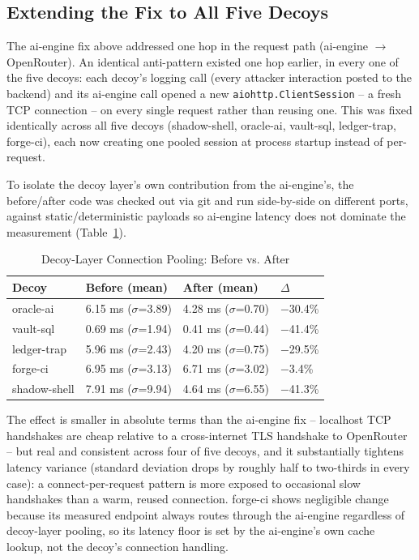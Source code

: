 \documentclass[conference]{IEEEtran}
\begin{document}
\subsection{Extending the Fix to All Five Decoys}

The ai-engine fix above addressed one hop in the request path (ai-engine
$\rightarrow$ OpenRouter). An identical anti-pattern existed one hop
earlier, in every one of the five decoys: each decoy's logging call (every
attacker interaction posted to the backend) and its ai-engine call opened a
new \texttt{aiohttp.ClientSession} -- a fresh TCP connection -- on every
single request rather than reusing one. This was fixed identically across
all five decoys (shadow-shell, oracle-ai, vault-sql, ledger-trap,
forge-ci), each now creating one pooled session at process startup instead
of per-request.

To isolate the decoy layer's own contribution from the ai-engine's, the
before/after code was checked out via git and run side-by-side on
different ports, against static/deterministic payloads so ai-engine
latency does not dominate the measurement (Table~\ref{tab:decoys}).

\begin{table}[htbp]
\caption{Decoy-Layer Connection Pooling: Before vs. After}
\label{tab:decoys}
\centering
\begin{tabular}{@{}llll@{}}
\toprule
\textbf{Decoy} & \textbf{Before (mean)} & \textbf{After (mean)} & \textbf{$\Delta$} \\
\midrule
oracle-ai & 6.15 ms ($\sigma$=3.89) & 4.28 ms ($\sigma$=0.70) & $-$30.4\% \\
vault-sql & 0.69 ms ($\sigma$=1.94) & 0.41 ms ($\sigma$=0.44) & $-$41.4\% \\
ledger-trap & 5.96 ms ($\sigma$=2.43) & 4.20 ms ($\sigma$=0.75) & $-$29.5\% \\
forge-ci & 6.95 ms ($\sigma$=3.13) & 6.71 ms ($\sigma$=3.02) & $-$3.4\% \\
shadow-shell & 7.91 ms ($\sigma$=9.94) & 4.64 ms ($\sigma$=6.55) & $-$41.3\% \\
\bottomrule
\end{tabular}
\end{table}

The effect is smaller in absolute terms than the ai-engine fix -- localhost
TCP handshakes are cheap relative to a cross-internet TLS handshake to
OpenRouter -- but real and consistent across four of five decoys, and it
substantially tightens latency variance (standard deviation drops by
roughly half to two-thirds in every case): a connect-per-request pattern
is more exposed to occasional slow handshakes than a warm, reused
connection. forge-ci shows negligible change because its measured endpoint
always routes through the ai-engine regardless of decoy-layer pooling, so
its latency floor is set by the ai-engine's own cache lookup, not the
decoy's connection handling.
\end{document}
